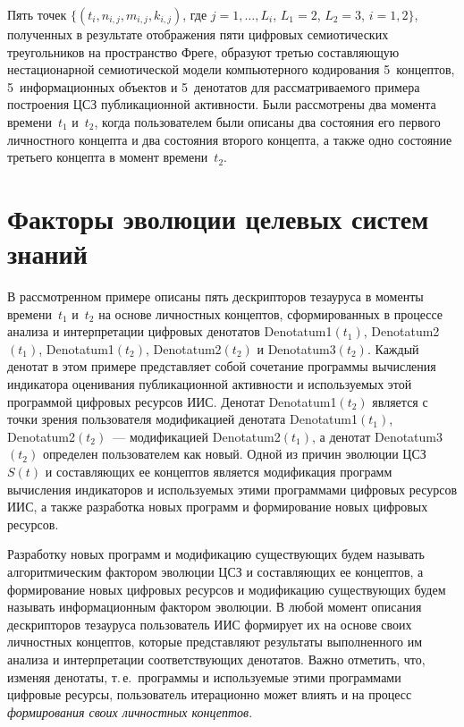 \begin{multicols}{2}
   Пять точек $\{(t_i, n_{i,j}, m_{i,j}, k_{i,j})$, где $j = 1,  \ldots , L_i$, $L_1 = 2$, $L_2 = 3$, $i = 1, 
2\}$, полученных в результате отображения пяти цифровых семиотических треугольников на 
пространство Фреге, образуют третью составляющую нестационарной семиотической модели 
компьютерного кодирования 5~концептов, 5~информационных объектов и 5~денотатов для 
рассматриваемого примера построения ЦСЗ публикационной активности. Были рассмотрены 
два момента времени~$t_1$ и~$t_2$, когда пользователем были описаны два состояния его 
первого личностного концепта и два состояния второго концепта, а также одно состояние 
третьего концепта в момент времени~$t_2$.

\section{Факторы эволюции целевых систем знаний}

   В рассмотренном примере описаны пять дескрипторов тезауруса в моменты 
времени~$t_1$ и~$t_2$ на основе личностных концептов, сформированных в процессе анализа 
и интерпретации циф\-ро\-вых денотатов Denotatum1$(t_1)$, Denotatum2$(t_1)$, 
Denotatum1$(t_2)$, Denotatum2$(t_2)$ и Denotatum3$(t_2)$. Каждый денотат в этом примере 
представляет собой сочетание программы вычисления индикатора оценивания 
публикационной активности и используемых этой программой цифровых ресурсов ИИС. 
Денотат Denotatum1$(t_2)$ является с точки зрения пользователя модификацией 
денотата Denotatum1$(t_1)$, Denotatum2$(t_2)$~--- модификацией Denotatum2$(t_1)$, а 
денотат Denotatum3$(t_2)$ определен пользователем как новый. Одной из причин эволюции 
ЦСЗ~$S(t)$ и составляющих ее концептов является модификация программ вычисления 
индикаторов и ис\-поль\-зу\-емых этими программами цифровых ресурсов ИИС, а также 
разработка новых программ и формирование новых цифровых ресурсов.
   
   Разработку новых программ и модификацию существующих будем называть 
алгоритмическим фактором эволюции ЦСЗ и составляющих ее концептов, а формирование 
новых цифровых ресурсов и модификацию существующих будем называть 
информационным фактором эволюции. В любой момент описания дескрипторов тезауруса 
пользователь ИИС формирует их на основе своих личностных концептов, которые 
представляют результаты выполненного им анализа и интерпретации соответствующих 
денотатов. Важно отметить, что, изменяя денотаты, т.\,е.\ программы и ис\-поль\-зу\-емые этими 
программами цифровые ресурсы, пользователь итерационно может влиять и на процесс 
\textit{формирования своих личностных концептов}.
   

\end{multicols}
